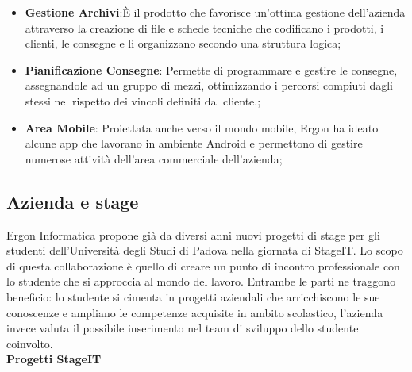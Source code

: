 \begin{itemize}
	\item \textbf{Gestione Archivi}:È il prodotto che favorisce un’ottima gestione dell’azienda attraverso la creazione di file e schede tecniche che codificano
	 i prodotti, i clienti, le consegne e li organizzano secondo una struttura logica;
	
	\item \textbf{Pianificazione Consegne}: Permette di programmare e gestire le consegne, assegnandole ad un gruppo di mezzi, ottimizzando i percorsi
	 compiuti dagli stessi nel rispetto dei vincoli definiti dal cliente.;
	
	\item \textbf{Area Mobile}: Proiettata anche verso il mondo mobile, Ergon ha ideato alcune app che lavorano in ambiente Android e permettono di 
	gestire numerose attività dell'area commerciale dell'azienda;
	
	
\end{itemize}

\subsection{Azienda e stage}

Ergon Informatica propone già da diversi anni nuovi progetti di stage per gli studenti dell'Università degli Studi di Padova nella giornata di StageIT. Lo scopo di questa collaborazione è quello di creare un punto di incontro professionale con lo studente che si approccia al mondo del lavoro. Entrambe le parti ne traggono beneficio: lo studente si cimenta in progetti aziendali che arricchiscono le sue conoscenze e ampliano le competenze acquisite in ambito scolastico, l'azienda invece valuta il possibile inserimento nel team di sviluppo dello studente coinvolto.\\

\textbf{Progetti StageIT}

